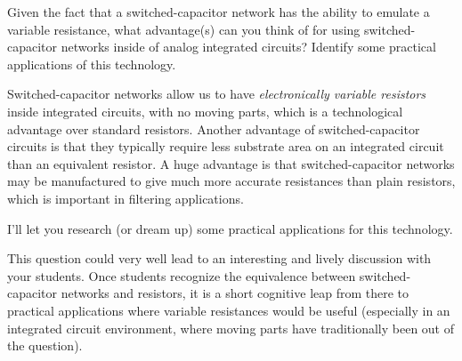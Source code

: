 

Given the fact that a switched-capacitor network has the ability to emulate a variable resistance, what advantage(s) can you think of for using switched-capacitor networks inside of analog integrated circuits?  Identify some practical applications of this technology.







Switched-capacitor networks allow us to have {\it electronically variable resistors} inside integrated circuits, with no moving parts, which is a technological advantage over standard resistors.  Another advantage of switched-capacitor circuits is that they typically require less substrate area on an integrated circuit than an equivalent resistor.  A huge advantage is that switched-capacitor networks may be manufactured to give much more accurate resistances than plain resistors, which is important in filtering applications.

\vskip 10pt

I'll let you research (or dream up) some practical applications for this technology.







This question could very well lead to an interesting and lively discussion with your students.  Once students recognize the equivalence between switched-capacitor networks and resistors, it is a short cognitive leap from there to practical applications where variable resistances would be useful (especially in an integrated circuit environment, where moving parts have traditionally been out of the question).




